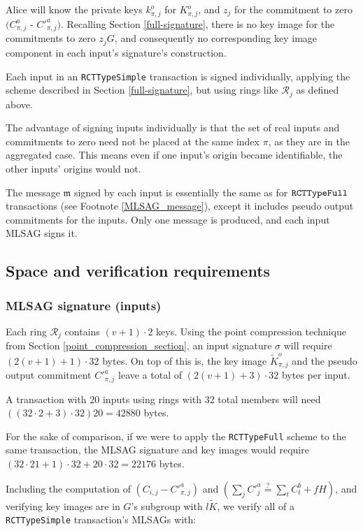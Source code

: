 Alice will know the private keys $k^o_{\pi,j}$ for $K^o_{\pi,j}$, and $z_j$ for the commitment to zero $(C^a_{\pi,j}$ - $C'^a_{\pi,j})$. Recalling Section \ref{full-signature}, there is no key image for the commitments to zero $z_j G$, and consequently no corresponding key image component in each input’s signature’s construction.

Each input in an {\tt RCTTypeSimple} transaction is signed individually, applying the scheme described in Section \ref{full-signature}, but using rings like \(\mathcal{R}_j\) as defined above.

The advantage of signing inputs individually is that the set of real inputs and commitments to zero need not be placed at the same index $\pi$, as they are in the aggregated case. This means even if one input's origin became identifiable, the other inputs' origins would not.

The message $\mathfrak{m}$ signed by each input is essentially the same as for $\tt RCTTypeFull$ transactions (see Footnote \ref{MLSAG_message}), except it includes pseudo output commitments for the inputs. Only one message is produced, and each input MLSAG signs it.


\subsection{Space and verification requirements}

\subsubsection*{MLSAG signature (inputs)}

Each ring \(\mathcal{R}_j\) contains \((v+1) \cdot 2\) keys. Using the point compression technique from Section \ref{point_compression_section}, an input signature $\sigma$ will require \( (2(v+1) + 1) \cdot 32  \) bytes. On top of this is, the key image $\tilde{K}^o_{\pi,j}$ and the pseudo output commitment $C'^a_{\pi,j}$ leave a total of $(2(v+1)+3) \cdot 32$ bytes per input.

A transaction with 20 inputs using rings with 32 total members will need \(((32 \cdot 2 + 3) \cdot 32) 20 = 42880 \) bytes.

For the sake of comparison, if we were to apply the {\tt RCTTypeFull} scheme to the same transaction, the MLSAG signature and key images would require \(( 32 \cdot 21 + 1) \cdot 32 + 20 \cdot 32 = 22176\) bytes.

Including the computation of \( (C_{i, j} - C'^a_{\pi, j}) \) and \( (\sum_j C'^a_{j} \stackrel{?}{=} \sum_t C^b_{t} + f H)\), and verifying key images are in $G$'s subgroup with $l \tilde{K}$, we verify all of a {\tt RCTTypeSimple} transaction's MLSAGs with:

